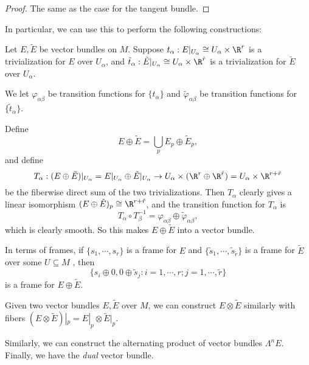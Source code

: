 \documentclass[a4paper]{article}
\begin{document}
\begin{proof}
  The same as the case for the tangent bundle.
\end{proof}

In particular, we can use this to perform the following constructions:
\begin{defi}
  Let $E, \tilde{E}$ be vector bundles on $M$. Suppose $t_\alpha: E|_{U_\alpha} \cong U_\alpha \times \R^r$ is a trivialization for $E$ over $U_\alpha$, and $\tilde{t}_\alpha: \tilde{E}|_{U_\alpha} \cong U_\alpha \times \R^{\tilde{r}}$ is a trivialization for $\tilde{E}$ over $U_\alpha$.

  We let $\varphi_{\alpha\beta}$ be transition functions for $\{t_\alpha\}$ and $\tilde{\varphi}_{\alpha\beta}$ be transition functions for $\{\tilde{t}_\alpha\}$.

  Define
  \[
    E \oplus \tilde{E} = \bigcup_p E_p \oplus \tilde{E}_p,
  \]
  and define
  \[
    T_\alpha: (E \oplus \tilde{E})|_{U_\alpha} = E|_{U_\alpha} \oplus \tilde{E}|_{U_\alpha} \to U_\alpha \times (\R^r \oplus \R^{\tilde{r}}) = U_\alpha \times \R^{r + \tilde{r}}
  \]
  be the fiberwise direct sum of the two trivializations. Then $T_\alpha$ clearly gives a linear isomorphism $(E \oplus \tilde{E})_p \cong \R^{r + \tilde{r}}$, and the transition function for $T_\alpha$ is
  \[
    T_\alpha \circ T_\beta^{-1} = \varphi_{\alpha\beta} \oplus \tilde{\varphi}_{\alpha\beta},
  \]
  which is clearly smooth. So this makes $E \oplus \tilde{E}$ into a vector bundle.
\end{defi}

In terms of frames, if $\{s_1, \cdots, s_r\}$ is a frame for $E$ and $\{\tilde{s}_1, \cdots, \tilde{s}_{\tilde{r}}\}$ is a frame for $\tilde{E}$ over some $U\subseteq M$ , then
\[
  \{s_i \oplus 0, 0 \oplus \tilde{s}_j: i = 1, \cdots, r; j = 1, \cdots, \tilde{r}\}
\]
is a frame for $E \oplus \tilde{E}$.

\begin{defi}
  Given two vector bundles $E, \tilde{E}$ over $M$, we can construct $E \otimes \tilde{E}$ similarly with fibers $(E \otimes \tilde{E})|_p = E|_p \otimes \tilde{E}|_p$.
\end{defi}

Similarly, we can construct the alternating product of vector bundles $\Lambda^n E$. Finally, we have the \emph{dual} vector bundle.
\end{document}
